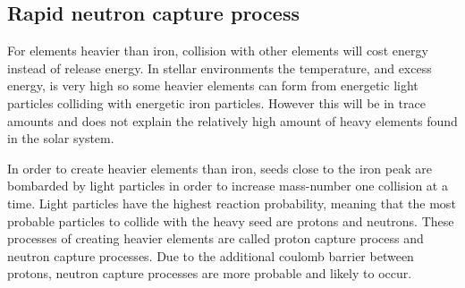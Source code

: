 \subsection{Rapid neutron capture process} \label{sec:rncp}
For elements heavier than iron, collision with other elements will cost energy instead of release energy.
In stellar environments the temperature, and excess energy, is very high so some heavier elements can form from
energetic light particles colliding with energetic iron particles. However this will be in trace amounts
and does not explain the relatively high amount of heavy elements found in the solar system.

In order to create heavier elements than iron, seeds close to the iron peak 
are bombarded by light particles in order to increase mass-number one collision at a time.
Light particles have the highest reaction probability, meaning that the most probable particles to collide with the heavy seed
are protons and neutrons.
These processes of creating heavier elements are called proton capture process and neutron capture processes.
Due to the additional coulomb barrier between protons, neutron capture processes are more probable and likely to occur.

